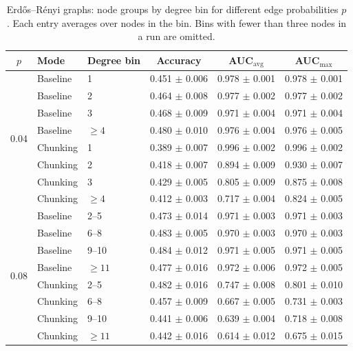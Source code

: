 \begin{table}[t]
\centering
\caption{Erd\H{o}s--R\'enyi graphs: node groups by degree bin for different edge probabilities $p$. Each entry averages over nodes in the bin. Bins with fewer than three nodes in a run are omitted.}
\label{tab:er_degree_bins_all}
\begin{tabular}{@{}c l l ccc@{}}
\toprule
$p$ & Mode & Degree bin & Accuracy & AUC$_{\text{avg}}$ & AUC$_{\text{max}}$ \\
\midrule

\multirow{8}{*}{0.04} & Baseline & 1 & 0.451 $\pm$ 0.006 & 0.978 $\pm$ 0.001 & 0.978 $\pm$ 0.001 \\
& Baseline & 2 & 0.464 $\pm$ 0.008 & 0.977 $\pm$ 0.002 & 0.977 $\pm$ 0.002 \\
& Baseline & 3 & 0.468 $\pm$ 0.009 & 0.971 $\pm$ 0.004 & 0.971 $\pm$ 0.004 \\
& Baseline & $\geq 4$ & 0.480 $\pm$ 0.010 & 0.976 $\pm$ 0.004 & 0.976 $\pm$ 0.005 \\
& Chunking & 1 & 0.389 $\pm$ 0.007 & 0.996 $\pm$ 0.002 & 0.996 $\pm$ 0.002 \\
& Chunking & 2 & 0.418 $\pm$ 0.007 & 0.894 $\pm$ 0.009 & 0.930 $\pm$ 0.007 \\
& Chunking & 3 & 0.429 $\pm$ 0.005 & 0.805 $\pm$ 0.009 & 0.875 $\pm$ 0.008 \\
& Chunking & $\geq 4$ & 0.412 $\pm$ 0.003 & 0.717 $\pm$ 0.004 & 0.824 $\pm$ 0.005 \\
\midrule

\multirow{8}{*}{0.08} & Baseline & 2--5 & 0.473 $\pm$ 0.014 & 0.971 $\pm$ 0.003 & 0.971 $\pm$ 0.003 \\
& Baseline & 6--8 & 0.483 $\pm$ 0.005 & 0.970 $\pm$ 0.003 & 0.970 $\pm$ 0.003 \\
& Baseline & 9--10 & 0.484 $\pm$ 0.012 & 0.971 $\pm$ 0.005 & 0.971 $\pm$ 0.005 \\
& Baseline & $\geq 11$ & 0.477 $\pm$ 0.016 & 0.972 $\pm$ 0.006 & 0.972 $\pm$ 0.005 \\
& Chunking & 2--5 & 0.482 $\pm$ 0.016 & 0.747 $\pm$ 0.008 & 0.801 $\pm$ 0.010 \\
& Chunking & 6--8 & 0.457 $\pm$ 0.009 & 0.667 $\pm$ 0.005 & 0.731 $\pm$ 0.003 \\
& Chunking & 9--10 & 0.441 $\pm$ 0.006 & 0.639 $\pm$ 0.004 & 0.718 $\pm$ 0.008 \\
& Chunking & $\geq 11$ & 0.442 $\pm$ 0.016 & 0.614 $\pm$ 0.012 & 0.675 $\pm$ 0.015 \\
\midrule


\end{tabular}
\end{table}
